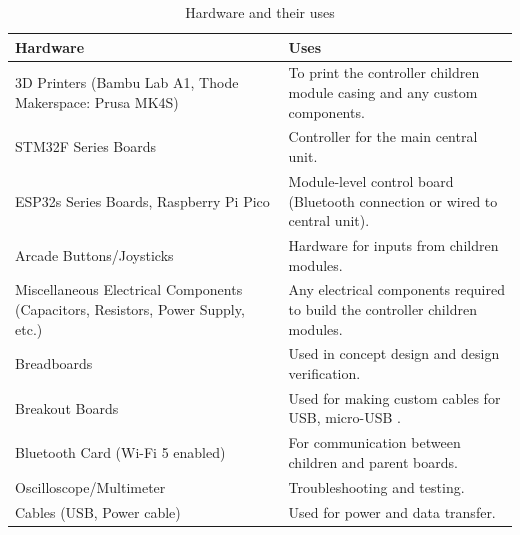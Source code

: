 \documentclass[a4]{article}
\begin{document}
\begin{table}[h!]
\renewcommand{\arraystretch}{1.2} %
\centering
\begin{tabularx}{\linewidth}{|Y|Y|}
\hline
\textcolor{McMasterMaroon}{\textbf{Hardware}} & \textcolor{McMasterMaroon}{\textbf{Uses}} \\
\hline
3D Printers (Bambu Lab A1, Thode Makerspace: Prusa MK4S) & To print the controller children module casing and any custom components. \\
\hline
STM32F Series Boards & Controller for the main central unit. \\
\hline
ESP32s Series Boards, Raspberry Pi Pico & Module-level control board (Bluetooth connection or wired to central unit). \\
\hline
Arcade Buttons/Joysticks & Hardware for inputs from children modules. \\
\hline
Miscellaneous Electrical Components (Capacitors, Resistors, Power Supply, etc.) & Any electrical components required to build the controller children modules. \\
\hline
Breadboards & Used in concept design and design verification. \\
\hline
Breakout Boards & Used for making custom cables for USB, micro-USB .\\
\hline
Bluetooth Card (Wi-Fi 5 enabled) & For communication between children and parent boards. \\
\hline
Oscilloscope/Multimeter & Troubleshooting and testing. \\
\hline
Cables (USB, Power cable) & Used for power and data transfer. \\
\hline
\end{tabularx}
\caption{Hardware and their uses}
\end{table}
\end{document}
